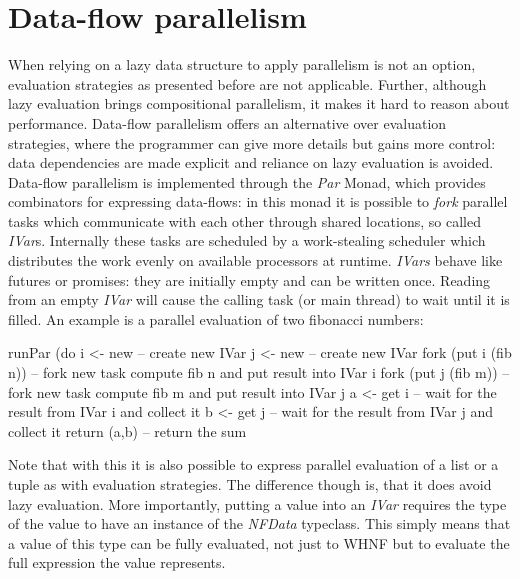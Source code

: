 \section{Data-flow parallelism}
When relying on a lazy data structure to apply parallelism is not an option, evaluation strategies as presented before are not applicable. Further, although lazy evaluation brings compositional parallelism, it makes it hard to reason about performance. Data-flow parallelism offers an alternative over evaluation strategies, where the programmer can give more details but gains more control: data dependencies are made explicit and reliance on lazy evaluation is avoided.
Data-flow parallelism is implemented through the \textit{Par} Monad, which provides combinators for expressing data-flows: in this monad it is possible to \textit{fork} parallel tasks which communicate with each other through shared locations, so called \textit{IVar}s. Internally these tasks are scheduled by a work-stealing scheduler which distributes the work evenly on available processors at runtime. \textit{IVars} behave like futures or promises: they are initially empty and can be written once. Reading from an empty \textit{IVar} will cause the calling task (or main thread) to wait until it is filled. An example is a parallel evaluation of two fibonacci numbers:

\begin{HaskellCode}
runPar (do
  i <- new             -- create new IVar
  j <- new             -- create new IVar
  fork (put i (fib n)) -- fork new task compute fib n and put result into IVar i
  fork (put j (fib m)) -- fork new task compute fib m and put result into IVar j
  a <- get i           -- wait for the result from IVar i and collect it
  b <- get j           -- wait for the result from IVar j and collect it
  return (a,b)         -- return the sum
\end{HaskellCode}

Note that with this it is also possible to express parallel evaluation of a list or a tuple as with evaluation strategies. The difference though is, that it does avoid lazy evaluation. More importantly, putting a value into an \textit{IVar} requires the type of the value to have an instance of the \textit{NFData} typeclass. This simply means that a value of this type can be fully evaluated, not just to WHNF but to evaluate the full expression the value represents.

